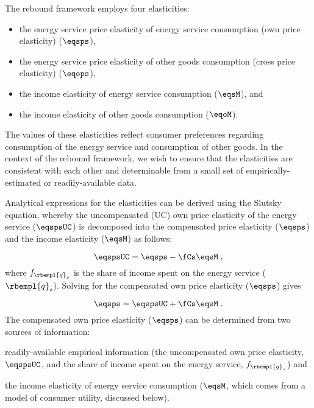 

The rebound framework employs four elasticities:
%
\begin{itemize}

  \item the energy service price elasticity of energy service consumption (own price elasticity) ($\eqsps$),

  \item the energy service price elasticity of other goods consumption (cross price elasticity) ($\eqops$), 
  
  \item the income elasticity of energy service consumption ($\eqsM$), and 
  
  \item the income elasticity of other goods consumption ($\eqoM$).

\end{itemize}
%
The values of these elasticities reflect consumer preferences regarding 
consumption of the energy service and consumption of other goods.
In the context of the rebound framework, 
we wish to ensure that the elasticities are consistent with each other
and determinable from a small set 
of empirically-estimated or readily-available data. 

Analytical expressions for the elasticities can be derived using the Slutsky equation, 
whereby the uncompensated (UC) own price elasticity 
of the energy service ($\eqspsUC$) 
is decomposed into the compensated price elasticity ($\eqsps$) and
the income elasticity ($\eqsM$) as follows:

\begin{equation}
  \eqspsUC = \eqsps - \fCs \eqsM \; ,
\end{equation}
%
where $f_{\rbempl{q}_s}$ is the share of income spent 
on the energy service ($\rbempl{q}_s$). 
Solving for the compensated own price elasticity ($\eqsps$) gives

\begin{equation} \label{eq:eqsps}
  \eqsps = \eqspsUC + \fCs \eqsM \; .
\end{equation}
%
The compensated own price elasticity ($\eqsps$)
can be determined from two sources of information:
%
\begin{enumerate*}[label={(\alph*)}]
	
  \item readily-available empirical information
        (the uncompensated own price elasticity, $\eqspsUC$, and 
        the share of income spent on the energy service, $f_{\rbempl{q}_s}$)
        and 
  
  \item the income elasticity of energy service consumption 
        ($\eqsM$, which comes from a model of consumer utility, discussed below).
    
\end{enumerate*}

